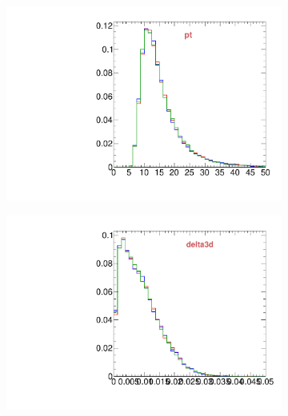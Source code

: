 \begin{figure}
\begin{subfigure}[b]{0.2\textwidth}
                \includegraphics[width=\textwidth]{Figures/VariablesComparison/Data_barrel_figs_3h/pt}
                \label{fig:Data_barrel_pt_3h}
        \end{subfigure}
        \begin{subfigure}[b]{0.2\textwidth}
                \centering
                \includegraphics[width=\textwidth]{Figures/VariablesComparison/Data_barrel_figs_3h/delta3d}
                \label{fig:Data_barrel_delta3d_3h}
        \end{subfigure}
        \begin{subfigure}[b]{0.2\textwidth}
                \centering

\end{subfigure}
\end{figure}
